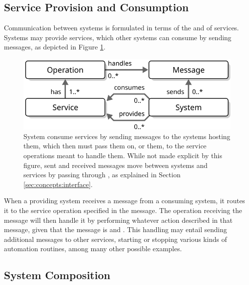 \vspace*{-3mm}

\subsection{Service Provision and Consumption}

Communication between systems is formulated in terms of the  and  of services.
Systems may provide services, which other systems can consume by sending messages, as depicted in Figure \ref{fig:service-consumption}.

\begin{figure}[ht!]
  \centering
  \includegraphics[scale=0.9]{figures/service-consumption}
  \caption{
    System consume services by sending messages to the systems hosting them, which then must pass them on, or  them, to the service operations meant to handle them.
    While not made explicit by this figure, sent and received messages move between systems and services by passing through , as explained in Section \ref{sec:concepts:interface}.
  }
  \label{fig:service-consumption}
\end{figure}

When a providing system receives a message from a consuming system, it routes it to the service operation specified in the message.
The operation receiving the message will then handle it by performing whatever action described in that message, given that the message is  and .
This handling may entail sending additional messages to other services, starting or stopping various kinds of automation routines, among many other possible examples.

\subsection{System Composition}

